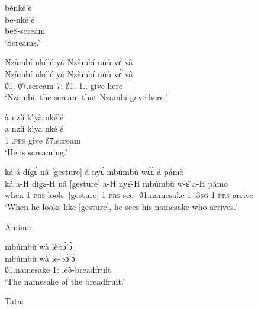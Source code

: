 \begin{exe}[(N234)] 
\exN\label{n205}
  \glll bènké'é \\
        be-nké'é \\
        be8-scream \\
    \trans `Screams.'
 
\exN\label{n206}
  \glll Nzàmbí nké'é yá Nzàmbí núù vɛ̀ vâ\\
         Nzàmbí nké'é yá Nzàmbí núù vɛ̀ vâ \\
      $\emptyset$1.{\PN} $\emptyset$7.scream 7:{\ATT}  $\emptyset$1.{\PN} 1.{\DEM}.{\PROX} give here   \\
    \trans `Nzambi, the scream that Nzambi gave here.'
 
\exN\label{n207}
  \glll à nzíí kìyà nké'é \\
          a nzíí kìya nké'é \\
        1 {\PROG}.\textsc{prs} give $\emptyset$7.scream \\
    \trans `He is screaming.'
 
\exN\label{n208}
  \glll ká á dígɛ́ nâ [gesture] á nyɛ́ mbúmbù wɛ́ɛ̀ á pámò \\
        ká a-H dígɛ-H nâ [gesture] a-H nyɛ̂-H mbúmbù w-ɛ̂ a-H pámo \\
       when 1-\textsc{prs} look-{\R} {\COMP} [gesture]  1-\textsc{prs} see-{\R} $\emptyset$1.namesake 1-{\POSS}.3\textsc{sg} 1-\textsc{prs} arrive \\
    \trans `When he looks like [gesture], he sees his namesake who arrives.'
\end{exe}

\noindent Aminu:

\begin{exe} 
\exN\label{n209}
  \glll mbúmbù wà lèbɔ́'ɔ̀ \\
         mbúmbù wà le-bɔ́'ɔ̀ \\
        $\emptyset$1.namesake 1:{\ATT}  le5-breadfruit \\
    \trans `The namesake of the breadfruit.'
\end{exe}

\noindent Tata:


